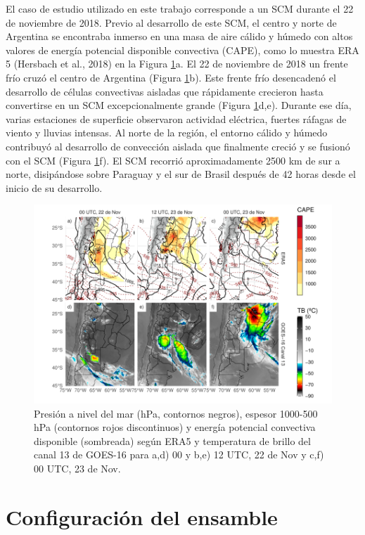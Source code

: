 \documentclass[12pt,twoside]{reedthesis}
\begin{document}
El caso de estudio utilizado en este trabajo corresponde a un SCM durante el 22 de noviembre de 2018. Previo al desarrollo de este SCM, el centro y norte de Argentina se encontraba inmerso en una masa de aire cálido y húmedo con altos valores de energía potencial disponible convectiva (CAPE), como lo muestra ERA 5 (Hersbach et al., 2018) en la Figura \ref{fig:caso}a. El 22 de noviembre de 2018 un frente frío cruzó el centro de Argentina (Figura \ref{fig:caso}b). Este frente frío desencadenó el desarrollo de células convectivas aisladas que rápidamente crecieron hasta convertirse en un SCM excepcionalmente grande (Figura \ref{fig:caso}d,e). Durante ese día, varias estaciones de superficie observaron actividad eléctrica, fuertes ráfagas de viento y lluvias intensas. Al norte de la región, el entorno cálido y húmedo contribuyó al desarrollo de convección aislada que finalmente creció y se fusionó con el SCM (Figura \ref{fig:caso}f). El SCM recorrió aproximadamente 2500 km de sur a norte, disipándose sobre Paraguay y el sur de Brasil después de 42 horas desde el inicio de su desarrollo.


\begin{figure}

{\centering \includegraphics{thesis_files/figure-latex/caso-1} 

}

\caption{Presión a nivel del mar (hPa, contornos negros), espesor 1000-500 hPa (contornos rojos discontinuos) y energía potencial convectiva disponible (sombreada) según ERA5 y temperatura de brillo del canal 13 de GOES-16 para a,d) 00 y b,e) 12 UTC, 22 de Nov y c,f) 00 UTC, 23 de Nov.~}\label{fig:caso}
\end{figure}
\hypertarget{configuraciuxf3n-del-ensamble}{%
\section{Configuración del ensamble}\label{configuraciuxf3n-del-ensamble}}
\end{document}
